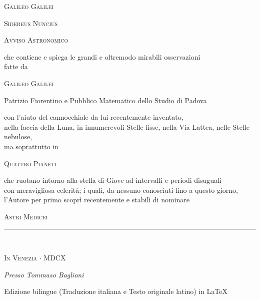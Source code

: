 \documentclass[11pt,twoside,openany]{book}
\begin{document}
\frontmatter

\begin{titlepage}
\centering
\vspace*{1cm}
{\Large\scshape Galileo Galilei\par}
\vspace{1.0cm}
{\Huge\scshape\color{rubric} Sidereus Nuncius\par}
\vspace{0.4cm}
{\Large\scshape Avviso Astronomico\par}
\vspace{0.8cm}
{\normalsize che contiene e spiega le grandi e oltremodo mirabili osservazioni\\
fatte da\par}
\vspace{0.3cm}
{\large\scshape Galileo Galilei\par}
{\small Patrizio Fiorentino e Pubblico Matematico dello Studio di Padova\par}
\vspace{0.4cm}
{\normalsize con l'aiuto del cannocchiale da lui recentemente inventato,\\
nella faccia della Luna, in innumerevoli Stelle fisse, nella Via Lattea, nelle Stelle nebulose,\\
ma soprattutto in\par}
\vspace{0.3cm}
{\large\scshape\color{rubric} Quattro Pianeti\par}
{\normalsize che ruotano intorno alla stella di Giove ad intervalli e periodi disuguali\\
con meravigliosa celerità; i quali, da nessuno conosciuti fino a questo giorno,\\
l'Autore per primo scoprì recentemente e stabilì di nominare\par}
\vspace{0.3cm}
{\large\scshape Astri Medicei\par}
\vfill
\rule{0.45\textwidth}{0.4pt}\\[0.5cm]
{\scshape In Venezia $\cdot$ MDCX\par}
{\small\itshape Presso Tommaso Baglioni\par}
\vspace{0.6cm}
{\footnotesize Edizione bilingue (Traduzione italiana e Testo originale latino) in \LaTeX\par}
\end{titlepage}

\end{document}

